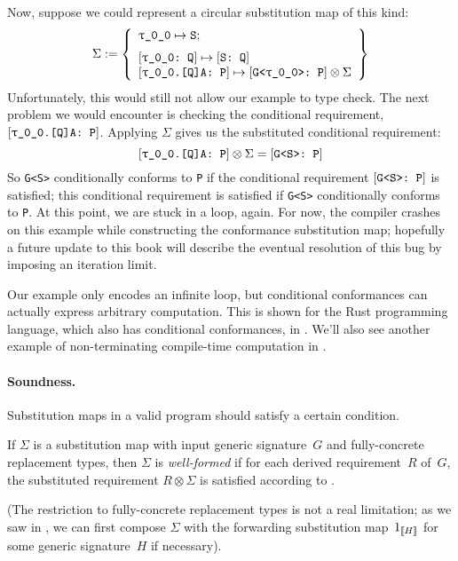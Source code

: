 \documentclass[../generics]{subfiles}
\begin{document}
Now, suppose we could represent a circular substitution map of this kind:
\[\Sigma := \SubstMapLongC{\SubstType{\ttgp{0}{0}}{S}}{
\SubstConf{\ttgp{0}{0}}{S}{Q}\\
\ConfReq{\ttgp{0}{0}.[Q]A}{P}\mapsto\ConfReq{G<\ttgp{0}{0}>}{P}\otimes\Sigma
}\]
Unfortunately, this would still not allow our example to type check. The next problem we would encounter is checking the conditional requirement, $\ConfReq{\ttgp{0}{0}.[Q]A}{P}$. Applying $\Sigma$ gives us the substituted conditional requirement:
\[\ConfReq{\ttgp{0}{0}.[Q]A}{P}\otimes\Sigma=\ConfReq{G<S>}{P}\]
So \texttt{G<S>} conditionally conforms to \texttt{P} if the conditional requirement $[\texttt{G<S>:~P}]$ is satisfied; this conditional requirement is satisfied if \texttt{G<S>} conditionally conforms to \texttt{P}. At this point, we are stuck in a loop, again. For now, the compiler crashes on this example while constructing the conformance substitution map; hopefully a future update to this book will describe the eventual resolution of this bug by imposing an iteration limit.

Our example only encodes an infinite loop, but conditional conformances can actually express arbitrary computation. This is shown for the Rust programming language, which also has conditional conformances, in \cite{rustturing}. We'll also see another example of non-terminating compile-time computation in .

\paragraph{Soundness.}
Substitution maps in a valid program should satisfy a certain condition.
\begin{definition}\label{valid subst map}
If $\Sigma$ is a substitution map with input generic signature~$G$ and fully-concrete replacement types, then $\Sigma$ is \emph{well-formed} if for each derived requirement~$R$ of~$G$, the substituted requirement $R\otimes\Sigma$ is satisfied according to .
\end{definition}
(The restriction to fully-concrete replacement types is not a real limitation; as we saw in , we can first compose $\Sigma$ with the forwarding substitution map~$1_{[\![H]\!]}$ for some generic signature~$H$ if necessary).
\end{document}
